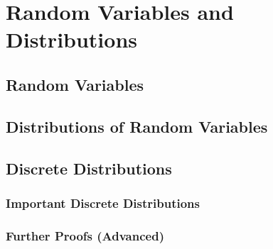 \chapter{Random Variables and Distributions}\label{chap:rvar_and_dist}
\minitoc
\section{Random Variables}
\section{Distributions of Random Variables}
\section{Discrete Distributions}
\subsection{Important Discrete Distributions}
\subsection{Further Proofs (Advanced)}\label{сhap:rvar_and_dist_sec:adv}